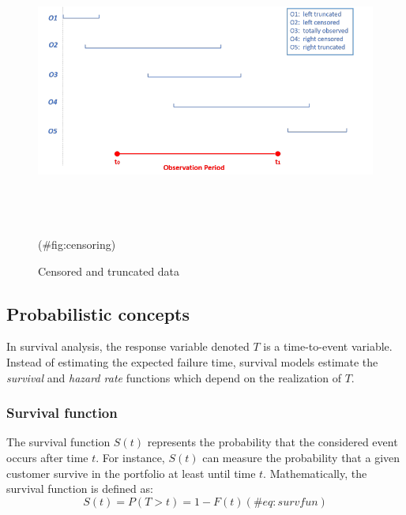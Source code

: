 \documentclass[
]{book}
\begin{document}
\begin{figure}

{\centering \includegraphics[width=500pt,height=250pt]{./imgs/censoring_and_truncation} 

}

\caption{Censored and truncated data}(\#fig:censoring)
\end{figure}

\hypertarget{probabilistic-concepts}{%
\subsection{Probabilistic concepts}\label{probabilistic-concepts}}

In survival analysis, the response variable denoted \(T\) is a time-to-event variable. Instead of estimating the expected failure time, survival models estimate the \emph{survival} and \emph{hazard rate} functions which depend on the realization of \(T\).

\hypertarget{survival-function}{%
\subsubsection*{Survival function}\label{survival-function}}

The survival function \(S(t)\) represents the probability that the considered event occurs after time \(t\). For instance, \(S(t)\) can measure the probability that a given customer survive in the portfolio at least until time \(t\). Mathematically, the survival function is defined as:
\begin{equation}
  S(t) = P(T > t) = 1 - F(t)
  (\#eq:survfun)
\end{equation}
\end{document}
